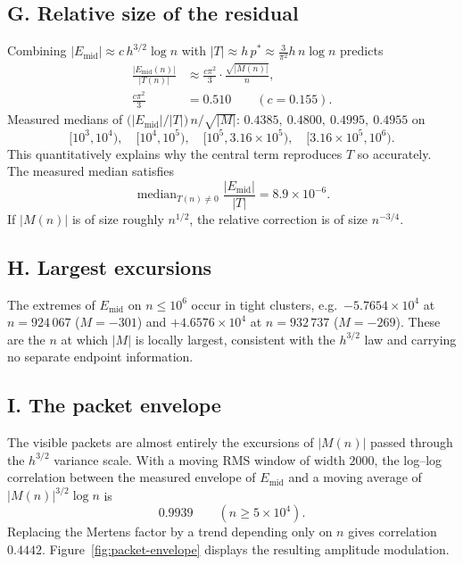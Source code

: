 \documentclass[11pt]{amsart}
\numberwithin{equation}{section}
\theoremstyle{plain}
\theoremstyle{definition}
\theoremstyle{remark}
\newcommand{\Mert}{M}
\begin{document}
\subsection{G. Relative size of the residual}
\label{sec:num-relative}
Combining $|E_{\mathrm{mid}}|\approx c\,h^{3/2}\log n$ with $|T|\approx
h\,p^{*}\approx \tfrac{3}{\pi^{2}}h\,n\log n$ predicts
\begin{equation}
\label{eq:relative-residual-prediction}
\begin{aligned}
\frac{|E_{\mathrm{mid}}(n)|}{|T(n)|}
&\approx \frac{c\pi^{2}}{3}\cdot\frac{\sqrt{|\Mert(n)|}}{n},\\
\frac{c\pi^{2}}{3}&=0.510 \qquad (c=0.155).
\end{aligned}
\end{equation}
Measured medians of $\bigl(|E_{\mathrm{mid}}|/|T|\bigr)\,n/\sqrt{|\Mert|}$:
$0.4385,\ 0.4800,\ 0.4995,\ 0.4955$ on
\begin{equation}
\label{eq:relative-residual-ranges}
[10^{3},10^{4}),\quad [10^{4},10^{5}),\quad
[10^{5},3.16\times10^{5}),\quad [3.16\times10^{5},10^{6}).
\end{equation}
This quantitatively explains why the central term reproduces $T$ so accurately.
The measured median satisfies
\begin{equation}
\label{eq:median-relative-residual}
\operatorname{median}_{T(n)\ne0}\frac{|E_{\mathrm{mid}}|}{|T|}=8.9\times10^{-6}.
\end{equation}
If $|\Mert(n)|$ is of size roughly $n^{1/2}$, the relative correction is of
size $n^{-3/4}$.

\subsection{H. Largest excursions}
\label{sec:num-extremes}
The extremes of $E_{\mathrm{mid}}$ on $n\le10^{6}$ occur in tight clusters,
e.g.\ $-5.7654\times10^{4}$ at $n=924\,067$ ($\Mert=-301$) and
$+4.6576\times10^{4}$ at $n=932\,737$ ($\Mert=-269$). These are the $n$ at which
$|\Mert|$ is locally largest, consistent with the $h^{3/2}$ law and carrying no
separate endpoint information.

\subsection{I. The packet envelope}
\label{sec:num-packets}
The visible packets are almost entirely the excursions of $|\Mert(n)|$ passed
through the $h^{3/2}$ variance scale. With a moving RMS window of width $2000$,
the log--log correlation between the measured envelope of $E_{\mathrm{mid}}$
and a moving average of $|\Mert(n)|^{3/2}\log n$ is
\begin{equation}
\label{eq:packet-correlation}
0.9939\qquad(n\ge5\times10^4).
\end{equation}
Replacing the Mertens factor by a trend depending only on $n$ gives correlation
$0.4442$. Figure~\ref{fig:packet-envelope} displays the resulting amplitude
modulation.
\end{document}
